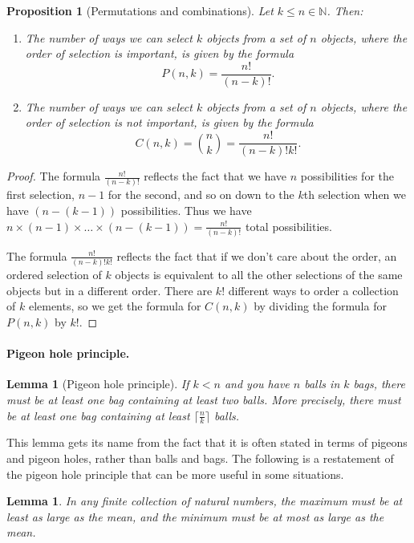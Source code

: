 \documentclass{article}
\theoremstyle{plain}
\newtheorem{proposition}[theorem]{Proposition}{\bfseries}{\itshape}
\newtheorem{lemma}[theorem]{Lemma}{\bfseries}{\upshape}
\newcommand{\bN}{\mathbb{N}}
\begin{document}
\begin{proposition}[Permutations and combinations]
Let $k\leq n\in\bN$. Then:
\begin{enumerate}
\item The number of ways we can select $k$ objects from a set of $n$ objects, where the order of selection is important, is given by the formula
\[P(n,k) = \frac{n!}{(n-k)!}.\]
\item The number of ways we can select $k$ objects from a set of $n$ objects, where the order of selection is \emph{not} important, is given by the formula
\[C(n,k) = {n \choose k} = \frac{n!}{(n-k)! k!}.\]
\end{enumerate}
\end{proposition}
\begin{proof}
The formula $\frac{n!}{(n-k)!}$ reflects the fact that we have $n$ possibilities for the first selection, $n-1$ for the second, and so on down to the $k$th selection when we have $(n-(k-1))$ possibilities. Thus we have $n\times (n-1)\times\ldots\times (n-(k-1)) = \frac{n!}{(n-k)!}$ total possibilities.

The formula $\frac{n!}{(n-k)! k!}$ reflects the fact that if we don't care about the order, an ordered selection of $k$ objects is equivalent to all the other selections of the same objects but in a different order. There are $k!$ different ways to order a collection of $k$ elements, so we get the formula for $C(n,k)$ by dividing the formula for $P(n,k)$ by $k!$.  
\end{proof}

\paragraph{Pigeon hole principle.}

\begin{lemma}[Pigeon hole principle]
If $k < n$ and you have $n$ balls in $k$ bags, there must be at least one bag containing at least two balls. More precisely, there must be at least one bag containing at least $\lceil \frac{n}{k}\rceil$ balls.
\end{lemma}
This lemma gets its name from the fact that it is often stated in terms of pigeons and pigeon holes, rather than balls and bags. The following is a restatement of the pigeon hole principle that can be more useful in some situations.

\begin{lemma}\label{L:Dij}
In any finite collection of natural numbers, the maximum must be at least as large as the mean, and the minimum must be at most as large as the mean.
\end{lemma}
\end{document}
